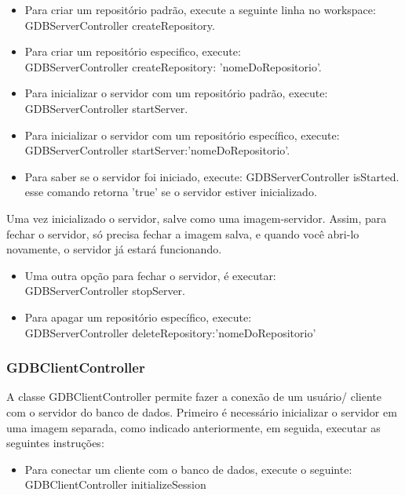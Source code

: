 \begin{itemize}
\item Para criar um repositório padrão, execute a seguinte linha no workspace:\\
 { GDBServerController createRepository.}
\item Para criar um repositório especifico, execute:\\
{GDBServerController createRepository: 'nomeDoRepositorio'.}
\item Para inicializar o servidor com um repositório padrão, execute:\\
{GDBServerController startServer.}
\item Para inicializar o servidor com um repositório específico, execute:\\
{GDBServerController startServer:'nomeDoRepositorio'.}
\item{Para saber se o servidor foi iniciado, execute:}
{GDBServerController isStarted.}\\
esse comando retorna 'true' se o servidor estiver inicializado.
\end{itemize}

Uma vez inicializado o servidor, salve como uma imagem-servidor. Assim, para fechar o servidor, só precisa fechar a imagem salva, e quando você abri-lo novamente, o servidor já estará funcionando.

\begin{itemize}
\item Uma outra opção para fechar o servidor, é executar:\\
{GDBServerController stopServer.}
\item Para apagar um repositório específico, execute:\\
{GDBServerController deleteRepository:'nomeDoRepositorio'}
\end{itemize}


\subsubsection{GDBClientController}

A classe GDBClientController permite fazer a conexão de um usuário/ cliente com o servidor do banco de dados.
Primeiro é necessário inicializar o servidor em uma imagem separada, como indicado anteriormente, em seguida, executar as seguintes instruções:

\begin{itemize}
\item Para conectar um cliente com o banco de dados, execute o seguinte:\\
{GDBClientController initializeSession}
\end{itemize}


